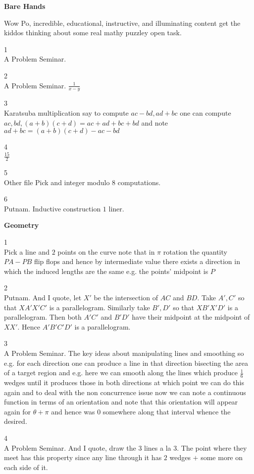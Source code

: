 \newpage

\textbf{Bare Hands}

Wow Po, incredible, educational, instructive, and illuminating content get the kiddos thinking about some real mathy puzzley open task.

1 \\
A Problem Seminar. 

2 \\
A Problem Seminar. $\boxed{\frac{1}{x-y}}$

3 \\
Karatsuba multiplication say to compute $ac-bd,ad+bc$ one can compute $ac,bd,(a+b)(c+d)=ac+ad+bc+bd$ and note $ad+bc=(a+b)(c+d)-ac-bd$

4 \\
$\boxed{\frac{15}{2}}$

5 \\
Other file Pick and integer modulo $8$ computations.

6 \\
Putnam. Inductive construction $1$ liner.

\newpage

\textbf{Geometry}

1 \\
Pick a line and $2$ points on the curve note that in $\pi$ rotation the quantity $PA-PB$ flip flops and hence by intermediate value there exists a direction in which the induced lengths are the same e.g. the points' midpoint is $P$

2 \\
Putnam. And I quote, let $X'$ be the intersection of $AC$ and $BD$. Take $A',C'$ so that $XA'X'C'$ is a parallelogram. Similarly take $B',D'$ so that $XB'X'D'$ is a parallelogram. Then both $A'C'$ and $B'D'$ have their midpoint at the midpoint of $XX'$. Hence $A'B'C'D'$ is a parallelogram.

3 \\
A Problem Seminar. The key ideas about manipulating lines and smoothing so e.g. for each direction one can produce a line in that direction bisecting the area of a target region and e.g. here we can smooth along the lines which produce $\frac{1}{6}$ wedges until it produces those in both directions at which point we can do this again and to deal with the non concurrence issue now we can note a continuous function in terms of an orientation and note that this orientation will appear again for $\theta+\pi$ and hence was $0$ somewhere along that interval whence the desired.

4 \\
A Problem Seminar. And I quote, draw the $3$ lines a la 3. The point where they meet has this property since any line through it has $2$ wedges $+$ some more on each side of it.

